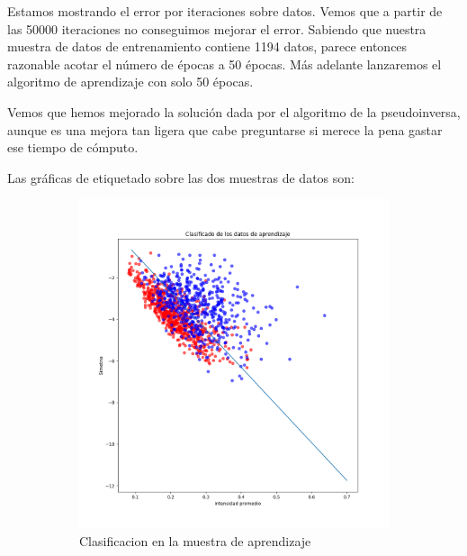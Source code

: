 \documentclass[11pt]{article}
\begin{document}
Estamos mostrando el error por iteraciones sobre datos. Vemos que a partir de las 50000 iteraciones no conseguimos mejorar el error. Sabiendo que nuestra muestra de datos de entrenamiento contiene 1194 datos, parece entonces razonable acotar el número de épocas a 50 épocas. Más adelante lanzaremos el algoritmo de aprendizaje con solo 50 épocas.

Vemos que hemos mejorado la solución dada por el algoritmo de la pseudoinversa, aunque es una mejora tan ligera que cabe preguntarse si merece la pena gastar ese tiempo de cómputo.

Las gráficas de etiquetado sobre las dos muestras de datos son:

\begin{figure}[H]
    \centering
    \begin{subfigure}{0.3\textwidth}
        \includegraphics[scale=0.35]{clasificacion_pocket_learning}
        \caption{Clasificacion en la muestra de aprendizaje}
    \end{subfigure} \hspace{0.2\textwidth}
    \begin{subfigure}{0.3\textwidth}

\end{subfigure}
\end{figure}
\end{document}

